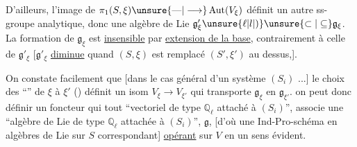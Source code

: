 D'ailleurs, l'image de $\pi_1(S,\xi)\unsure{\text{---}|\longrightarrow}\operatorname{Aut}(V_\xi)$ définit un autre ss-groupe analytique, donc une algèbre de Lie $\mathfrak g'_\xi\unsure{\ell|l|)}\unsure{\subset|\subseteq}\mathfrak g_\xi$. La formation de $\mathfrak g_\xi$ est  \uline{insensible} par \uline{extension  de la base}, contrairement à celle de $\mathfrak g'_\xi$ [$\mathfrak g'_\xi$ \uline{diminue} quand $(S,\xi)$ est remplacé  $(S',\xi')$ au dessus,].

On constate facilement que [dans le cas général d'un système $(S_i)$ ...]  le choix des  ``'' de $\xi$ à $\xi'$  () définit
un isom $V_\xi\longrightarrow V_{\xi'}$ qui transporte $\mathfrak g_\xi$ en $\mathfrak g_{\xi'}$.  on peut donc définir \unsure{---} un foncteur  qui  tout ``vectoriel de type $\mathbb Q_\ell$ attaché à $(S_i)$'',  associe une ``algèbre de Lie de type $\mathbb Q_\ell$ attachée à $(S_i)$'',  $\mathfrak g$,  [d'où une Ind-Pro-schéma en algèbres de Lie sur $S$ correspondant] \uline{opérant} sur $V$ en un sens évident.

